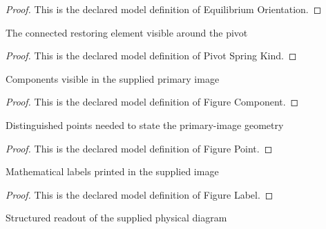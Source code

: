 \begin{proof}
  This is the declared model definition of Equilibrium Orientation.
\end{proof}
\begin{definition}
  \label{def:physics:phyx-mini-0270:phyxminiproblems-problemphyxmini0270-pivotspringkind}
  The connected restoring element visible around the pivot
\end{definition}
\begin{proof}
  This is the declared model definition of Pivot Spring Kind.
\end{proof}
\begin{definition}
  \label{def:physics:phyx-mini-0270:phyxminiproblems-problemphyxmini0270-figurecomponent}
  Components visible in the supplied primary image
\end{definition}
\begin{proof}
  This is the declared model definition of Figure Component.
\end{proof}
\begin{definition}
  \label{def:physics:phyx-mini-0270:phyxminiproblems-problemphyxmini0270-figurepoint}
  Distinguished points needed to state the primary-image geometry
\end{definition}
\begin{proof}
  This is the declared model definition of Figure Point.
\end{proof}
\begin{definition}
  \label{def:physics:phyx-mini-0270:phyxminiproblems-problemphyxmini0270-figurelabel}
  Mathematical labels printed in the supplied image
\end{definition}
\begin{proof}
  This is the declared model definition of Figure Label.
\end{proof}
\begin{definition}
  \label{def:physics:phyx-mini-0270:phyxminiproblems-problemphyxmini0270-diskpendulumfigure}
  Structured readout of the supplied physical diagram
\end{definition}

